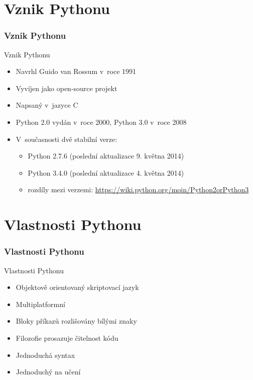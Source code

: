 \documentclass[color=rose,utf8]{beamer}
\newcommand{\myurl}[1]{{\scriptsize\color{blue}\url{#1}}}
\begin{document}
  \section{Vznik Pythonu}
  \begin{frame}[t]
    \frametitle{Vznik Pythonu}
    \begin{block}{Vznik Pythonu}
      \begin{itemize}
        \item Navrhl Guido van Rossum v~roce 1991
        \item Vyvíjen jako open-source projekt
        \item Napsaný v~jazyce C
        \item Python 2.0 vydán v~roce 2000, Python 3.0 v~roce 2008
        \item V~současnosti dvě stabilní verze:
        \begin{itemize}
          \item Python 2.7.6 (poslední aktualizace 9. května 2014)
          \item Python 3.4.0 (poslední aktualizace 4. května 2014)
          \item rozdíly mezi verzemi:
            \myurl{https://wiki.python.org/moin/Python2orPython3}
        \end{itemize}
      \end{itemize}
    \end{block}
  \end{frame}


  \section{Vlastnosti Pythonu}
  \begin{frame}[t]
    \frametitle{Vlastnosti Pythonu}
    \begin{block}{Vlastnosti Pythonu}
      \begin{itemize}
        \item Objektově orientovaný skriptovací jazyk
        \item Multiplatformní
        \item Bloky příkazů rozlišovány bílými znaky
        \item Filozofie prosazuje čitelnost kódu
        \item Jednoduchá syntax
        \item Jednoduchý na učení
      \end{itemize}
    \end{block}
  \end{frame}
\end{document}
